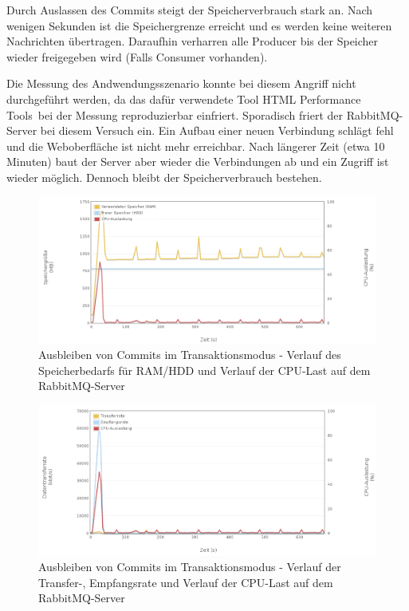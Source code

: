 \documentclass[	a4paper,
			11pt,
			oneside,
			parskip]{scrartcl}
\begin{document}
	
	\clearpage
		{
		  \newline
		  \newline
		  \newline
		}{
		 Durch Auslassen des Commits steigt der Speicherverbrauch stark an. Nach wenigen Sekunden ist die Speichergrenze erreicht und es werden keine weiteren Nachrichten übertragen. Daraufhin verharren alle Producer bis der Speicher wieder freigegeben wird (Falls Consumer vorhanden).
		}{
		 Die Messung des Andwendungsszenario konnte bei diesem Angriff nicht durchgeführt werden, da das dafür verwendete Tool \glqq HTML Performance Tools\grqq\ bei der Messung reproduzierbar einfriert. Sporadisch friert der RabbitMQ-Server bei diesem Versuch ein. Ein Aufbau einer neuen Verbindung schlägt fehl und die Weboberfläche ist nicht mehr erreichbar. Nach längerer Zeit (etwa 10 Minuten) baut der Server aber wieder die Verbindungen ab und ein Zugriff ist wieder möglich. Dennoch bleibt der Speicherverbrauch bestehen.

		}

		\begin{figure}[!htb]
			\centering
			\includegraphics[width=\textwidth]{img/tx/tx_server1.png}
			\caption{Ausbleiben von Commits im Transaktionsmodus - Verlauf des Speicherbedarfs für RAM/HDD und Verlauf der CPU-Last auf dem RabbitMQ-Server}
			\label{fig:tx-server1}
		\end{figure}
		
		\begin{figure}[!htb]
			\centering
			\includegraphics[width=\textwidth]{img/tx/tx_server2.png}
			\caption{Ausbleiben von Commits im Transaktionsmodus - Verlauf der Transfer-, Empfangsrate und Verlauf der CPU-Last auf dem RabbitMQ-Server}
			\label{fig:tx-server2}
		\end{figure}
	
\end{document}
